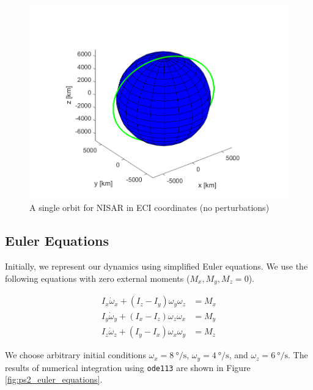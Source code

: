\begin{figure}[H]
\centering
\includegraphics[scale=0.7]{Images/ps2_problem1.png}
\caption{A single orbit for NISAR in ECI coordinates (no perturbations)}
\label{fig:simple_propagator}
\end{figure}

\subsection{Euler Equations}
Initially, we represent our dynamics using simplified Euler equations. We use the following equations with zero external moments ($M_{x}, M_{y}, M_{z} = 0$).

\begin{align*}
    I_{x} \Dot{\omega}_{x} + (I_{z} - I_{y}) \omega_{y} \omega_{z} &= M_{x} \\
    I_{y} \Dot{\omega}_{y} + (I_{x} - I_{z}) \omega_{z} \omega_{x} &= M_{y} \\
    I_{z} \Dot{\omega}_{z} + (I_{y} - I_{x}) \omega_{x} \omega_{y} &= M_{z}
\end{align*}

We choose arbitrary initial conditions $\omega_{x} = \qty{8}{\degree\per\second}$, $\omega_{y} = \qty{4}{\degree\per\second}$, and $\omega_{z} = \qty{6}{\degree\per\second}$. The results of numerical integration using \texttt{ode113} are shown in Figure \ref{fig:ps2_euler_equations}.

